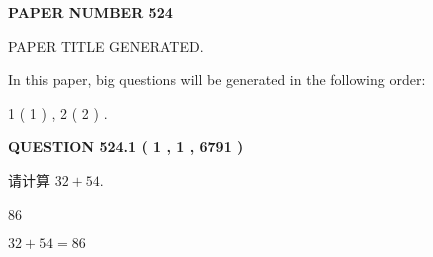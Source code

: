 \documentclass{ctexart}
\begin{document}
   
   
   
\newpage 
\setcounter{page}{ 
   524001 } 
   
   
   
   
 {\textbf{ \Large{ PAPER NUMBER  524  }}}
   
   
\vspace{0.2in}
   
   
   
   
   
   
   
   
 \vspace{0.2in}
 
 
 
 
   
   
 PAPER TITLE GENERATED.
   
   
   
\vspace{0.2in}
   
In this paper, big questions will be generated in the following order: 
   
   
   1 ( 1 )
 ,
   2 ( 2 )
 .
  
\vspace{0.2in}
  
{\textbf{\Large{QUESTION
524.1 
 ( 1 , 1 , 6791 )
}}}
  
  
 
请计算 $ %
32 +  %
54 $.
 
 
 
\noindent{}
 
 

86
 
 
\noindent{}
 
 

 
 
 
\noindent{}
 
 

$ %
32 +  %
54=   %
86$
 
 
\noindent{}
 
 

 
   
   
   
\end{document}
